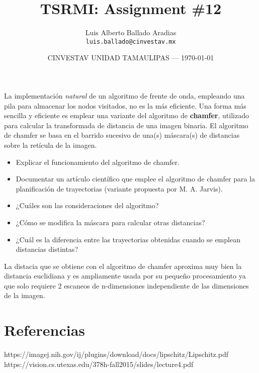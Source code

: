\documentclass{article}
\title{TSRMI: Assignment \#12} %
\author{Luis Alberto Ballado Aradias\\ \texttt{luis.ballado@cinvestav.mx}} %
\date{CINVESTAV UNIDAD TAMAULIPAS --- \today} %
\begin{document}
\maketitle %


La implementación \textit{natural} de un algoritmo de frente de onda, empleando una pila para almacenar los nodos visitados, no es la más eficiente. Una forma más sencilla y eficiente es emplear una variante del algoritmo de \textbf{chamfer}, utilizado para calcular la transformada de distancia de una imagen binaria. El algoritmo de chamfer se basa en el barrido sucesivo de una(s) máscara(s) de distancias sobre la retícula de la imagen.\\

\begin{itemize}
\item Explicar el funcionamiento del algoritmo de chamfer.

  
  
\item Documentar un artículo científico que emplee el algoritmo de chamfer para la planificación de trayectorias (variante propuesta por M. A. Jarvis).
\item ¿Cuáles son las consideraciones del algoritmo?
\item ¿Cómo se modifica la máscara para calcular otras distancias?
\item ¿Cuál es la diferencia entre las trayectorias obtenidas cuando se emplean distancias distintas?
\end{itemize}

La distacia que se obtiene con el algoritmo de chamfer aproxima muy bien la distancia euclidiana y es ampliamente usada por su pequeño procesamiento ya que solo requiere 2 escaneos de n-dimensiones independiente de las dimensiones de la imagen.

\section*{Referencias}

https://imagej.nih.gov/ij/plugins/download/docs/lipschitz/Lipschitz.pdf
https://vision.cs.utexas.edu/378h-fall2015/slides/lecture4.pdf
\end{document}
